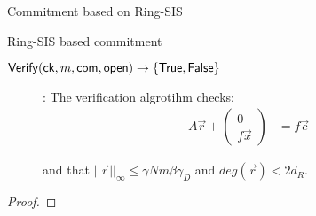 \begin{section}{Commitment based on  Ring-SIS~\cite{DBLP:journals/iacr/BaumDOP16}}
\begin{construction}{Ring-SIS based commitment}
\begin{description}
          \item[${\mathsf{Verify}}(\mathsf{ck}, m, \mathsf{com}, \mathsf{open}) \to \{\mathsf{True}, \mathsf{False}\}$]: The verification algrotihm checks:
            \begin{align*}
              A\vec{r} + \left( \begin{matrix} 0 \\ f\vec{x} \end{matrix}\right) &= f\vec{c}
            \end{align*}
            
            and that $||\vec{r}||_\infty \leq \gamma N m \beta \gamma_D$ and $deg(\vec{r}) < 2 d_R$.
            
          \end{description}
        \end{construction}
        \begin{proof}
          
        \end{proof}
	
\end{section}